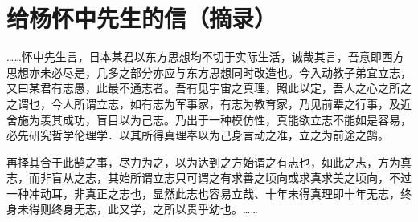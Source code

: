 \section{给杨怀中先生的信（摘录）}


……怀中先生言，日本某君以东方思想均不切于实际生活，诚哉其言，吾意即西方思想亦未必尽是，几多之部分亦应与东方思想同时改造也。今入动教子弟宜立志，又曰某君有志愚，此最不通志者。吾有见宇宙之真理，照此以定，吾人之心之所之之谓也，今人所谓立志，如有志为军事家，有志为教育家，乃见前辈之行事，及近舍施为羡其成功，盲目以为己志。乃出于一种模仿性，真能欲立志不能如是容易，必先研究哲学伦理学．以其所得真理奉以为己身言动之准，立之为前途之鹄。

再择其合于此鹄之事，尽力为之，以为达到之方始谓之有志也，如此之志，方为真志，而非盲从之志，其始所谓立志只可谓之有求善之顷向或求真求美之顷向，不过一种冲动耳，非真正之志也，显然此志也容易立哉、十年未得真理即十年无志，终身未得则终身无志，此又学，之所以贵乎幼也。……

